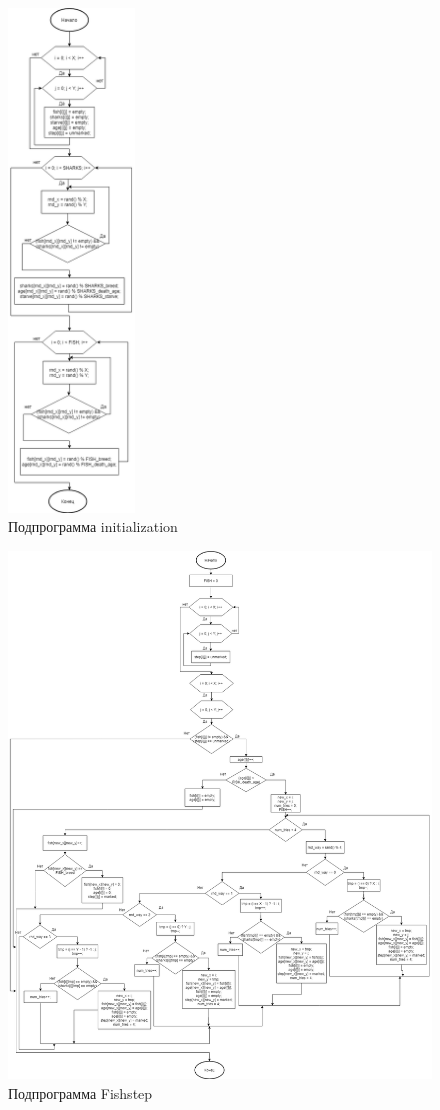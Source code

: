 \documentclass[14pt]{extarticle}
\begin{document}
\begin{figure}[!h]
  \centering
  \includegraphics[width=0.3\textwidth]{initialization22.png}
  \caption{Подпрограмма initialization\label{first}}
\end{figure}
\newpage
\begin{figure}[!h]
  \centering
  \includegraphics[width=1\textwidth]{fishstep.png}
  \caption{Подпрограмма Fishstep\label{second}}
\end{figure}
\end{document}
